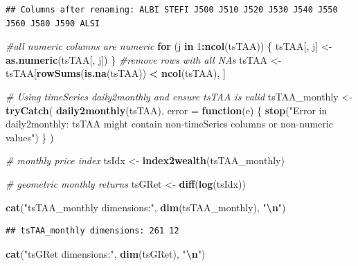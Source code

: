 \documentclass[
  12pt,
]{article}
\newenvironment{Shaded}{\begin{snugshade}}{\end{snugshade}}
\newcommand{\AttributeTok}[1]{\textcolor[rgb]{0.13,0.29,0.53}{#1}}
\newcommand{\CommentTok}[1]{\textcolor[rgb]{0.56,0.35,0.01}{\textit{#1}}}
\newcommand{\ControlFlowTok}[1]{\textcolor[rgb]{0.13,0.29,0.53}{\textbf{#1}}}
\newcommand{\DecValTok}[1]{\textcolor[rgb]{0.00,0.00,0.81}{#1}}
\newcommand{\FunctionTok}[1]{\textcolor[rgb]{0.13,0.29,0.53}{\textbf{#1}}}
\newcommand{\NormalTok}[1]{#1}
\newcommand{\OtherTok}[1]{\textcolor[rgb]{0.56,0.35,0.01}{#1}}
\newcommand{\SpecialCharTok}[1]{\textcolor[rgb]{0.81,0.36,0.00}{\textbf{#1}}}
\newcommand{\StringTok}[1]{\textcolor[rgb]{0.31,0.60,0.02}{#1}}
\begin{document}
\begin{verbatim}
## Columns after renaming: ALBI STEFI J500 J510 J520 J530 J540 J550 J560 J580 J590 ALSI
\end{verbatim}

\begin{Shaded}
\begin{Highlighting}[]
\CommentTok{\#all numeric columns are numeric}
\ControlFlowTok{for}\NormalTok{ (j }\ControlFlowTok{in} \DecValTok{1}\SpecialCharTok{:}\FunctionTok{ncol}\NormalTok{(tsTAA)) \{}
\NormalTok{  tsTAA[, j] }\OtherTok{\textless{}{-}} \FunctionTok{as.numeric}\NormalTok{(tsTAA[, j])}
\NormalTok{\}}
\CommentTok{\#remove rows with all NAs}
\NormalTok{tsTAA }\OtherTok{\textless{}{-}}\NormalTok{ tsTAA[}\FunctionTok{rowSums}\NormalTok{(}\FunctionTok{is.na}\NormalTok{(tsTAA)) }\SpecialCharTok{\textless{}} \FunctionTok{ncol}\NormalTok{(tsTAA), ]}

\CommentTok{\# Using timeSeries daily2monthly and ensure tsTAA is valid}
\NormalTok{tsTAA\_monthly }\OtherTok{\textless{}{-}} \FunctionTok{tryCatch}\NormalTok{(}
  \FunctionTok{daily2monthly}\NormalTok{(tsTAA),}
  \AttributeTok{error =} \ControlFlowTok{function}\NormalTok{(e) \{}
    \FunctionTok{stop}\NormalTok{(}\StringTok{"Error in daily2monthly: tsTAA might contain non{-}timeSeries columns or non{-}numeric values"}\NormalTok{)}
\NormalTok{  \}}
\NormalTok{)}

\CommentTok{\#  monthly price index}
\NormalTok{tsIdx  }\OtherTok{\textless{}{-}} \FunctionTok{index2wealth}\NormalTok{(tsTAA\_monthly)}

\CommentTok{\# geometric monthly returns}
\NormalTok{tsGRet }\OtherTok{\textless{}{-}} \FunctionTok{diff}\NormalTok{(}\FunctionTok{log}\NormalTok{(tsIdx))}

\FunctionTok{cat}\NormalTok{(}\StringTok{"tsTAA\_monthly dimensions:"}\NormalTok{, }\FunctionTok{dim}\NormalTok{(tsTAA\_monthly), }\StringTok{"}\SpecialCharTok{\textbackslash{}n}\StringTok{"}\NormalTok{)}
\end{Highlighting}
\end{Shaded}

\begin{verbatim}
## tsTAA_monthly dimensions: 261 12
\end{verbatim}

\begin{Shaded}
\begin{Highlighting}[]
\FunctionTok{cat}\NormalTok{(}\StringTok{"tsGRet dimensions:"}\NormalTok{, }\FunctionTok{dim}\NormalTok{(tsGRet), }\StringTok{"}\SpecialCharTok{\textbackslash{}n}\StringTok{"}\NormalTok{)}
\end{Highlighting}
\end{Shaded}
\end{document}
